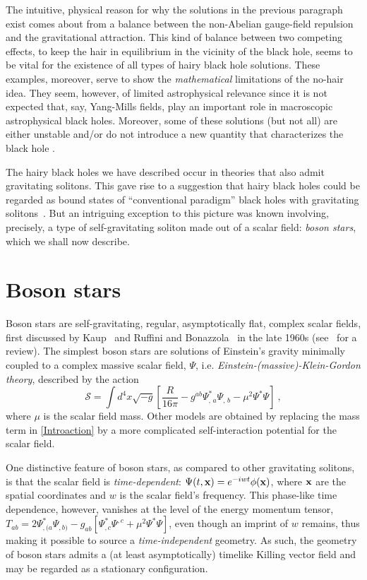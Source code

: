 The intuitive, physical reason for why the solutions in the previous paragraph exist comes about from a balance between the non-Abelian gauge-field repulsion and the gravitational attraction.
This kind of balance between two competing effects, to keep the hair in equilibrium in the vicinity of the black hole, seems to be vital for the existence of all types of hairy black hole solutions.
These examples, moreover, serve to show the \textit{mathematical} limitations of the no-hair idea.
They seem, however, of limited astrophysical relevance since it is not expected that, say, Yang-Mills fields, play an important role in macroscopic astrophysical black holes.
Moreover, some of these solutions (but not all) are  either unstable and/or do not introduce a new quantity that characterizes the black hole \cite{Mavromatos:1995fc}.

The hairy black holes we have described occur in theories that also admit gravitating solitons. This gave rise to a suggestion that hairy black holes could be regarded as bound states of ``conventional paradigm'' black holes with gravitating solitons~\cite{Ashtekar:2000nx}. But an intriguing exception to this picture was known involving, precisely, a type of self-gravitating soliton made out of a scalar field: \textit{boson stars}, which we shall now describe.





\section{Boson stars}
\label{sec:bs}
Boson stars are self-gravitating, regular, asymptotically flat, complex scalar fields, first discussed by Kaup~\cite{Kaup:1968zz} and Ruffini and Bonazzola~\cite{Ruffini:1969qy} in the late 1960s (see~\cite{Schunck:2003kk} for a review).
The simplest boson stars are solutions of Einstein's gravity minimally coupled to a complex massive scalar field, $\Psi$, i.e. \textit{Einstein-(massive)-Klein-Gordon theory}, described by the action
\begin{equation}
\mathcal{S}= \int  d^4x\sqrt{-g}\left[\frac{R }{16\pi }
   - g^{ab}\Psi_{, \, a}^* \Psi_{, \, b} - \mu^2 \Psi^*\Psi
 \right] \ ,
 \label{Introaction}
 \end{equation}
where $\mu$ is the scalar field mass.
Other models are obtained by replacing the mass term in \eqref{Introaction} by a more complicated self-interaction potential for the scalar field. 

One distinctive feature of boson stars, as compared to other gravitating solitons, is that the scalar field is \textit{time-dependent}: $\Psi(t,{\bf x})=e^{-iwt}\phi({\bf x})$, where ${\bf x}$ are the spatial coordinates and $w$ is the scalar field's frequency.
This phase-like time dependence, however, vanishes at the level of the energy momentum tensor, $T_{ab}=2 \Psi_{ , (a}^*\Psi_{,b)}-g_{ab}  [  \Psi_{,c}^*\Psi^{,c}+\mu^2 \Psi^*\Psi]$, even though an imprint of $w$ remains, thus making it possible to source a \textit{time-independent} geometry.
As such, the geometry of boson stars admits a (at least asymptotically) timelike Killing vector field and may be regarded as a stationary configuration. 

